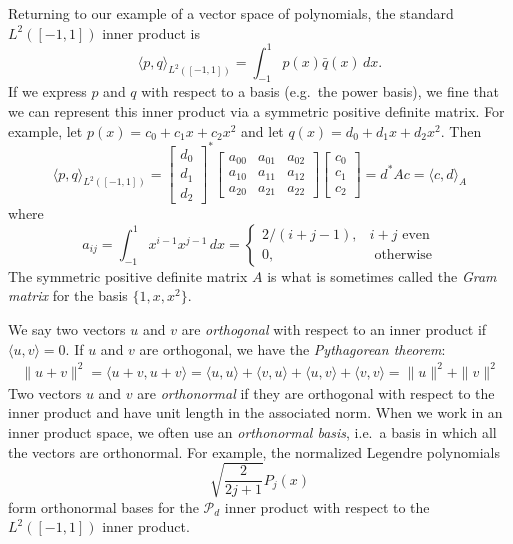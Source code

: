 \documentclass[12pt, leqno]{article} %
\begin{document}
Returning to our example of a vector space of polynomials,
the standard $L^2([-1,1])$ inner product is
\[
  \langle p, q \rangle_{L^2([-1,1])} = \int_{-1}^1 p(x) \bar{q}(x) \, dx.
\]
If we express $p$ and $q$ with respect to a basis (e.g.~the power
basis), we fine that we can represent this inner product via a
symmetric positive definite matrix.  For example,
let $p(x) = c_0 + c_1 x + c_2 x^2$ and let
$q(x) = d_0 + d_1 x + d_2 x^2$.  Then
\[
  \langle p, q \rangle_{L^2([-1,1])} =
  \begin{bmatrix} d_0 \\ d_1 \\ d_2 \end{bmatrix}^*
  \begin{bmatrix}
    a_{00} & a_{01} & a_{02} \\
    a_{10} & a_{11} & a_{12} \\
    a_{20} & a_{21} & a_{22}
  \end{bmatrix}
  \begin{bmatrix} c_0 \\ c_1 \\ c_2 \end{bmatrix} =
  d^* A c = \langle c, d \rangle_A
\]
where
\[
a_{ij} = \int_{-1}^1 x^{i-1} x^{j-1} \, dx =
\begin{cases}
  2/(i+j-1), & i+j \mbox{ even} \\
  0, & \mbox{ otherwise}
\end{cases}
\]
The symmetric positive definite matrix $A$ is what is sometimes called
the {\em Gram matrix} for the basis $\{1, x, x^2\}$.

We say two vectors $u$ and $v$ are {\em orthogonal} with respect to an
inner product if $\langle u, v \rangle = 0$.  If $u$ and $v$ are
orthogonal, we have the {\em Pythagorean theorem}:
\begin{align*}
  \|u+v\|^2
  = \langle u + v, u + v \rangle
  = \langle u, u \rangle + \langle v, u \rangle + \langle u, v \rangle
  + \langle v, v \rangle
  = \|u\|^2 + \|v\|^2
\end{align*}
Two vectors $u$ and $v$ are {\em orthonormal} if they are orthogonal
with respect to the inner product and have unit length in the associated
norm.  When we work in an inner product space, we often use an
{\em orthonormal basis}, i.e.~a basis in which all the vectors are
orthonormal.  For example, the normalized Legendre polynomials
\[
  \sqrt{\frac{2}{2j+1}} P_j(x)
\]
form orthonormal bases for the $\mathcal{P}_d$ inner product with
respect to the $L^2([-1,1])$ inner product.
\end{document}
